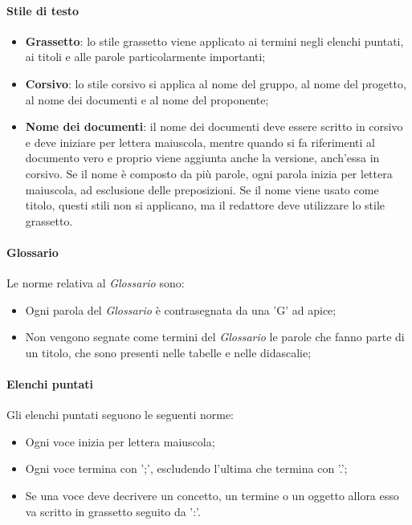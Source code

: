 \paragraph{Stile di testo}
\begin{itemize}

	\item \textbf{Grassetto}: lo stile grassetto viene applicato ai termini negli elenchi puntati, ai titoli e alle parole particolarmente importanti;
	
	\item \textbf{Corsivo}: lo stile corsivo si applica al nome del gruppo, al nome del progetto, al nome dei documenti e al nome del proponente;
	
	\item \textbf{Nome dei documenti}: il nome dei documenti deve essere scritto in corsivo e deve iniziare per lettera maiuscola, mentre quando si fa riferimenti al documento vero e proprio viene aggiunta anche la versione, anch'essa in corsivo. Se il nome è composto da più parole, ogni parola inizia per lettera maiuscola, ad esclusione delle preposizioni.  Se il nome viene usato come titolo, questi stili non si applicano, ma il redattore deve utilizzare lo stile grassetto.

\end{itemize}

\paragraph{Glossario}
Le norme relativa al \textit{Glossario} sono:
\begin{itemize}

	\item Ogni parola del \textit{Glossario} è contrasegnata da una 'G' ad apice;
	
	\item Non vengono segnate come termini del \textit{Glossario} le parole che fanno parte di un titolo, che sono presenti nelle tabelle e nelle didascalie;

\end{itemize}

\paragraph{Elenchi puntati}
Gli elenchi puntati seguono le seguenti norme:
\begin{itemize}

	\item Ogni voce inizia per lettera maiuscola;
	
	\item Ogni voce termina con ';', escludendo l'ultima che termina con '.';
	
	\item Se una voce deve decrivere un concetto, un termine o un oggetto allora esso va scritto in grassetto seguito da ':'.
\end{itemize}

